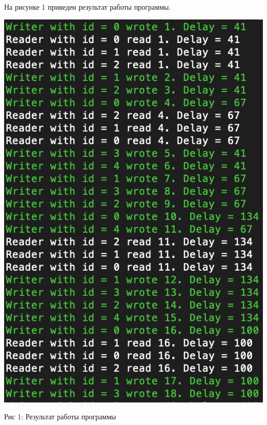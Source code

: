 \documentclass[12pt]{report}
\begin{document}
На рисунке 1 приведен результат работы программы.
\begin{center}
		\includegraphics[scale=0.8]{pics/RW.png}
		
			Рис 1:  Результат работы программы 
\end{center}
\end{document}
